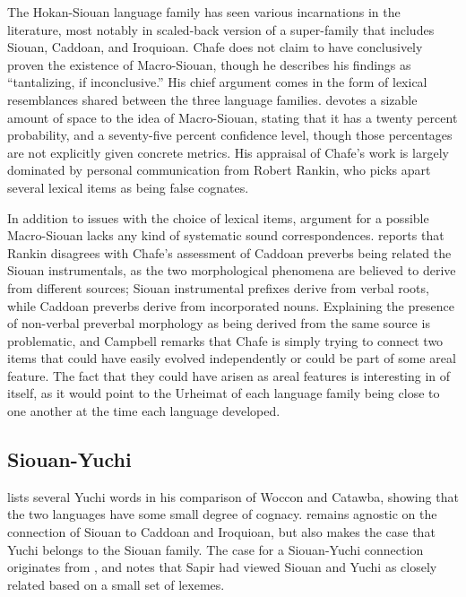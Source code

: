 \documentclass[output=paper]{LSP/langsci}
\begin{document}
The Hokan-Siouan language family has seen various incarnations in the literature, most notably in  scaled-back version of a super-family that includes Siouan, Caddoan, and Iroquioan. Chafe does not claim to have conclusively proven the existence of Macro-Siouan, though he describes his findings as ``tantalizing, if inconclusive.'' His chief argument comes in the form of lexical resemblances shared between the three language families. \citet{Campbell2000} devotes a sizable amount of space to the idea of Macro-Siouan, stating that it has a twenty percent probability, and a seventy-five percent confidence level, though those percentages are not explicitly given concrete metrics. His appraisal of Chafe's work is largely dominated by personal communication from Robert Rankin, who picks apart several lexical items as being false cognates.

In addition to issues with the choice of lexical items,  argument for a possible Macro-Siouan lacks any kind of systematic sound correspondences. \citet{Campbell2000} reports that Rankin disagrees with Chafe's assessment of Caddoan preverbs being related the Siouan instrumentals, as the two morphological phenomena are believed to derive from different sources; Siouan instrumental prefixes derive from verbal roots, while Caddoan preverbs derive from incorporated nouns. Explaining the presence of non-verbal preverbal morphology as being derived from the same source is problematic, and Campbell remarks that Chafe is simply trying to connect two items that could have easily evolved independently or could be part of some areal feature. The fact that they could have arisen as areal features is interesting in of itself, as it would point to the Urheimat of each language family being close to one another at the time each language developed.

\subsection{Siouan-Yuchi}

\citet{Carter1980} lists several Yuchi words in his comparison of Woccon and Catawba, showing that the two languages have some small degree of cognacy. \citet{Rankin1996,Rankin1998scy} remains agnostic on the connection of Siouan to Caddoan and Iroquioan, but also makes the case that Yuchi belongs to the Siouan family. The case for a Siouan-Yuchi connection originates from \citet{Sapir1929}, and \citet{Haas1952} notes that Sapir had viewed Siouan and Yuchi as closely related based on a small set of lexemes.
\end{document}
